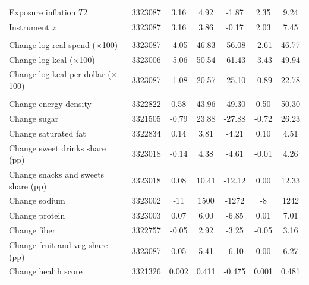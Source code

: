 \begin{tabular}{
    l
    S[table-format=9]
    S[table-format=-5.3]
    S[table-format=5.3]
    S[table-format=-5.3]
    S[table-format=-5.3]
    S[table-format=5.3]
}
\quad Exposure inflation \(T2\) & 3323087 & 3.16 & 4.92 & -1.87 & 2.35 & 9.24 \\
\quad Instrument \(z\) & 3323087 & 3.16 & 3.86 & -0.17 & 2.03 & 7.45 \\
\addlinespace
{} \\
\quad Change log real spend (\(\times\)100) & 3323087 & -4.05 & 46.83 & -56.08 & -2.61 & 46.77 \\
\quad Change log kcal (\(\times\)100) & 3323006 & -5.06 & 50.54 & -61.43 & -3.43 & 49.94 \\
\quad Change log kcal per dollar (\(\times\)100) & 3323087 & -1.08 & 20.57 & -25.10 & -0.89 & 22.78 \\
\addlinespace
{} \\
\quad Change energy density & 3322822 & 0.58 & 43.96 & -49.30 & 0.50 & 50.30 \\
\quad Change sugar & 3321505 & -0.79 & 23.88 & -27.88 & -0.72 & 26.23 \\
\quad Change saturated fat & 3322834 & 0.14 & 3.81 & -4.21 & 0.10 & 4.51 \\
\quad Change sweet drinks share (pp) & 3323018 & -0.14 & 4.38 & -4.61 & -0.01 & 4.26 \\
\quad Change snacks and sweets share (pp) & 3323018 & 0.08 & 10.41 & -12.12 & 0.00 & 12.33 \\
\quad Change sodium & 3323002 & -11 & 1500 & -1272 & -8 & 1242 \\
\quad Change protein & 3323003 & 0.07 & 6.00 & -6.85 & 0.01 & 7.01 \\
\quad Change fiber & 3322757 & -0.05 & 2.92 & -3.25 & -0.05 & 3.16 \\
\quad Change fruit and veg share (pp) & 3323087 & 0.05 & 5.41 & -6.10 & 0.00 & 6.27 \\
\quad Change health score & 3321326 & 0.002 & 0.411 & -0.475 & 0.001 & 0.481 \\
\bottomrule
\end{tabular}
